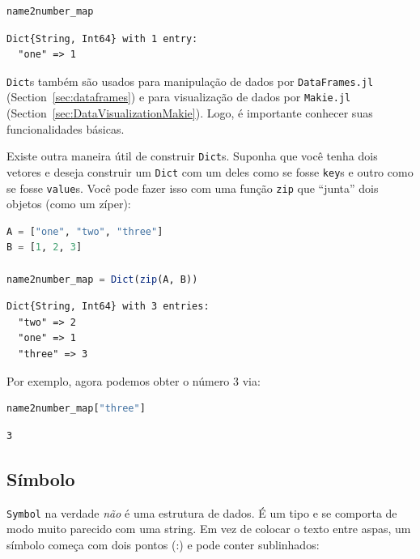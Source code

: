 \documentclass[
  notoc %
]{tufte-book}
\newcommand{\passthrough}[1]{#1}
\begin{document}
\begin{lstlisting}[language=Julia]
name2number_map
\end{lstlisting}

\begin{lstlisting}[language=Output]
Dict{String, Int64} with 1 entry:
  "one" => 1
\end{lstlisting}

\passthrough{\lstinline!Dict!}s também são usados para manipulação de
dados por \passthrough{\lstinline!DataFrames.jl!}
(Section~\ref{sec:dataframes}) e para visualização de dados por
\passthrough{\lstinline!Makie.jl!}
(Section~\ref{sec:DataVisualizationMakie}). Logo, é importante conhecer
suas funcionalidades básicas.

Existe outra maneira útil de construir \passthrough{\lstinline!Dict!}s.
Suponha que você tenha dois vetores e deseja construir um
\passthrough{\lstinline!Dict!} com um deles como se fosse
\passthrough{\lstinline!key!}s e outro como se fosse
\passthrough{\lstinline!value!}s. Você pode fazer isso com uma função
\passthrough{\lstinline!zip!} que ``junta'' dois objetos (como um
zíper):

\begin{lstlisting}[language=Julia]
A = ["one", "two", "three"]
B = [1, 2, 3]

name2number_map = Dict(zip(A, B))
\end{lstlisting}

\begin{lstlisting}[language=Output]
Dict{String, Int64} with 3 entries:
  "two" => 2
  "one" => 1
  "three" => 3
\end{lstlisting}

Por exemplo, agora podemos obter o número 3 via:

\begin{lstlisting}[language=Julia]
name2number_map["three"]
\end{lstlisting}

\begin{lstlisting}[language=Output]
3
\end{lstlisting}

\hypertarget{sec:symbol}{%
\subsection{Símbolo}\label{sec:symbol}}

\passthrough{\lstinline!Symbol!} na verdade \emph{não} é uma estrutura
de dados. É um tipo e se comporta de modo muito parecido com uma string.
Em vez de colocar o texto entre aspas, um símbolo começa com dois pontos
(:) e pode conter sublinhados:
\end{document}
